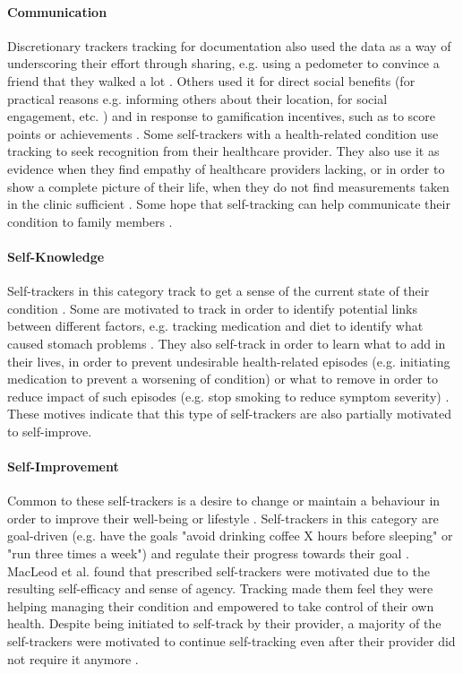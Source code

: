 \paragraph{Communication} 
Discretionary trackers tracking for documentation also used the data as a way of underscoring their effort through sharing, e.g. using a pedometer to convince a friend that they walked a lot \citep{Rooksby2014}. Others used it for direct social benefits (for practical reasons e.g. informing others about their location, for social engagement, etc. \citep{Epstein2015}) and in response to gamification incentives, such as to score points or achievements \citep{Rooksby2014}. Some self-trackers with a health-related condition use tracking to seek recognition from their healthcare provider. They also use it as evidence when they find empathy of healthcare providers lacking, or in order to show a complete picture of their life, when they do not find measurements taken in the clinic sufficient \citep{Chung2016}. Some hope that self-tracking can help communicate their condition to family members \citep{MacLeod2014}. 

\paragraph{Self-Knowledge} \label{selfknowledge}
Self-trackers in this category track to get a sense of the current state of their condition \citep{MacLeod2014, Ancker2015}. Some are motivated to track in order to identify potential links between different factors, e.g. tracking medication and diet to identify what caused stomach problems \citep{Rooksby2014}. They also self-track in order to learn what to add in their lives, in order to prevent undesirable health-related episodes (e.g. initiating medication to prevent a worsening of condition) or what to remove in order to reduce impact of such episodes (e.g. stop smoking to reduce symptom severity) \citep{MacLeod2014}. These motives indicate that this type of self-trackers are also partially motivated to self-improve. 

\paragraph{Self-Improvement} \label{selfimprove}
Common to these self-trackers is a desire to change or maintain a behaviour in order to improve their well-being or lifestyle \citep{MacLeod2014, Ancker2015, Chung2016, Li2011, Whooley2014}. Self-trackers in this category are goal-driven (e.g. have the goals "avoid drinking coffee X hours before sleeping" or "run three times a week") and regulate their progress towards their goal \citep{Chung2016, Rooksby2014, Li2011}. MacLeod et al. found that prescribed self-trackers were motivated due to the resulting self-efficacy and sense of agency. Tracking made them feel they were helping managing their condition and empowered to take control of their own health. Despite being initiated to self-track by their provider, a majority of the self-trackers were motivated to continue self-tracking even after their provider did not require it anymore \citep{MacLeod2014}. 

